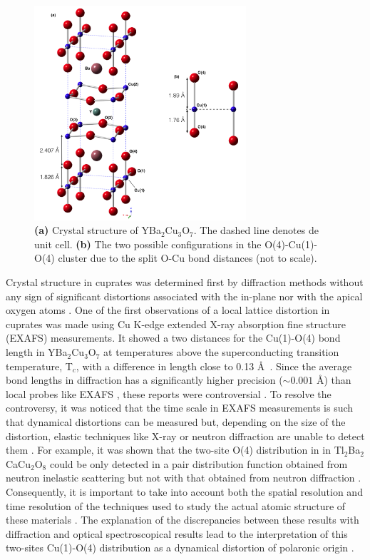 \begin{figure}[ht]
  \centering
  \includegraphics[width=0.7\textwidth]{images/YBCO_O-Cu-O.jpg}
  \caption[Crystal structure of YBa$_{2}$Cu$_{3}$O$_{7}$ and the two possible O(4)-Cu(1)-O(4) configurations.]
  {\textbf{(a)} Crystal structure of YBa$_{2}$Cu$_{3}$O$_{7}$. The dashed line denotes de unit cell. \textbf{(b)} The two possible configurations in the O(4)-Cu(1)-O(4) cluster due to the split O-Cu bond distances (not to scale).}
\label{fig:YBCO_structure}
\end{figure}

Crystal structure in cuprates was determined first by diffraction methods without any sign of significant distortions associated with the in-plane nor with the apical oxygen atoms \cite{Capponi1987,Schafer1988}. 
One of the first observations of a local lattice distortion in cuprates was made using Cu K-edge extended X-ray absorption fine structure (EXAFS) measurements.
It showed a two distances for the Cu(1)-O(4) bond length in YBa$_2$Cu$_3$O$_7$ at temperatures above the superconducting transition temperature, T$_{c}$, with a difference in length close to 0.13 \AA\ \cite{MustredeLeon1990,Conradson1990}.
Since the average bond lengths in diffraction has a significantly higher precision ($\sim 0.001$ \AA \cite{Miceli1988}) than local probes like EXAFS \cite{Rehr2000}, these reports were controversial \cite{Kwei1990}.
To resolve the controversy, it was noticed that the time scale in EXAFS measurements is such that dynamical distortions can be measured but, depending on the size of the distortion, elastic techniques like X-ray or neutron diffraction are unable to detect them \cite{Salkola1995}.
For example, it was shown that the two-site O(4) distribution in in Tl$_{2}$Ba$_{2}$CaCu$_{2}$O$_{8}$ could be only detected in a pair distribution function obtained from neutron inelastic scattering but not with that obtained from neutron diffraction \cite{Egami1991}. 
Consequently, it is important to take into account both the spatial resolution and time resolution of the techniques used to study the actual atomic structure of these materials \cite{Mihailovic2005}. 
The explanation of the discrepancies between these results with diffraction and optical spectroscopical results lead to the interpretation of this two-sites Cu(1)-O(4) distribution as a dynamical distortion of polaronic origin \cite{MustredeLeon1992}.

